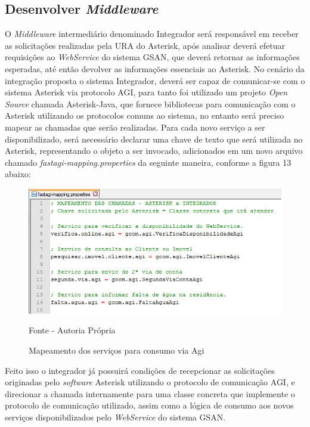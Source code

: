 \subsection{Desenvolver \textit{Middleware}}

O \textit{Middleware} intermediário denominado Integrador será responsável em receber as solicitações realizadas pela URA do Asterisk, após analisar deverá efetuar requisições ao \textit{WebService} do sistema GSAN, que deverá retornar as informações esperadas, até então devolver as informações essenciais ao Asterisk.
No cenário da integração proposta o sistema Integrador, deverá ser capaz de comunicar-se com o sistema Asterisk via protocolo AGI, para tanto foi utilizado um projeto \textit{Open Source} chamada Asterisk-Java, que fornece bibliotecas para comunicação com o Asterisk utilizando os protocolos comuns ao sistema, no entanto será preciso mapear as chamadas que serão realizadas.
Para cada novo serviço a ser disponibilizado, será necessário declarar uma chave de texto que será utilizada no Asterisk, representando o objeto a ser invocado, adicionados em um novo arquivo chamado \textit{fastagi-mapping.properties} da seguinte maneira, conforme a figura 13 abaixo:

\begin{figure}[!htb]
	\centering
	\includegraphics{figuras/mapeamento_servicos_agi.png}
	\caption{Mapeamento dos serviços para consumo via Agi}	
	Fonte - Autoria Própria
\end{figure}


Feito isso o integrador já possuirá condições de recepcionar as solicitações originadas pelo \textit{software} Asterisk utilizando o protocolo de comunicação AGI, e direcionar a chamada internamente para uma classe concreta que implemente o protocolo de comunicação utilizado, assim como a lógica de consumo aos novos serviços disponibilizados pelo \textit{WebService} do sistema GSAN.

